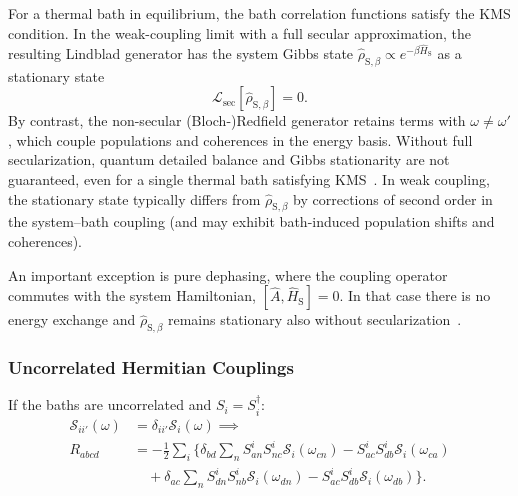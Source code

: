 For a thermal bath in equilibrium, the bath correlation functions satisfy the KMS condition.
In the weak-coupling limit with a full secular approximation, the resulting
Lindblad generator has the system Gibbs state \(\hat{\rho}_{\mathrm{S},\beta} \propto e^{-\beta \hat{H}_{\mathrm{S}}}\) as a stationary state~\cite{lendialicki2007quantumdynamicalsemigroups,davies1974markovianmasterequations}
\begin{equation*}
  \mathcal{L}_{\mathrm{sec}}\!\left[\hat{\rho}_{\mathrm{S},\beta}\right] = 0 .
\end{equation*}
By contrast, the non-secular (Bloch-)Redfield generator retains terms with $\omega\neq\omega'$,
which couple populations and coherences in the energy basis. Without full secularization,
quantum detailed balance and Gibbs stationarity are not guaranteed, even for a single thermal bath
satisfying KMS~\cite{trushechkinetal2022openquantumsystem,breuerpetruccione2007theoryopenquantum}.
In weak coupling, the stationary state typically differs from $\hat{\rho}_{\mathrm{S},\beta}$ by corrections of
second order in the system--bath coupling (and may exhibit bath-induced population shifts and
coherences).

An important exception is pure dephasing, where the coupling operator commutes with the system Hamiltonian, $[\hat{A},\hat{H}_{\mathrm{S}}]=0$. In that case there is no energy exchange and $\hat{\rho}_{\mathrm{S},\beta}$ remains stationary also without secularization~\cite{breuerpetruccione2007theoryopenquantum}.


\subsubsection{Uncorrelated Hermitian Couplings}

If the baths are uncorrelated and $S_i=S_i^\dagger$:
\begin{align*}
	\mathcal{S}_{ii'}(\omega) & = \delta_{ii'} \mathcal{S}_i(\omega) \implies                           \\
	R_{abcd}                  & = -\frac{1}{2} \sum_{i} \Big\{
	\delta_{bd} \sum_n S^{i}_{an} S^{i}_{nc} \mathcal{S}_{i}(\omega_{cn})
	- S^{i}_{ac} S^{i}_{db} \mathcal{S}_{i}(\omega_{ca})                                                \\
	                          & \quad + \delta_{ac} \sum_n S^{i}_{dn} S^{i}_{nb} \mathcal{S}_{i}(\omega_{dn})
	- S^{i}_{ac} S^{i}_{db} \mathcal{S}_{i}(\omega_{db})
	\Big\}.
\end{align*}


